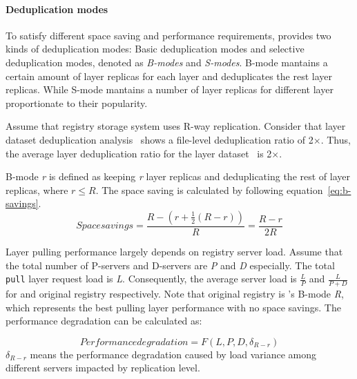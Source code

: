 \paragraph{Deduplication modes}
\label{sec:dedup-mode}

To satisfy different space saving and performance requirements,
\sysname provides two kinds of deduplication modes:
Basic deduplication modes and selective deduplication modes, denoted as \emph{B-modes} and \emph{S-modes}.
B-mode mantains a certain amount of layer replicas for each layer and deduplicates the rest layer replicas.
While S-mode mantains a number of layer replicas for different layer proportionate to their popularity.

Assume that registry storage system uses R-way replication.
Consider that layer dataset deduplication analysis~\cite{xxx} shows a file-level deduplication ratio of 2$\times$.
Thus, the average layer deduplication ratio for the layer dataset~\cite{xxx} is 2$\times$.

B-mode \emph{r} is defined as keeping \emph{r} layer replicas and deduplicating the rest of layer replicas, where $r \leq R$. 
The space saving is calculated by following equation~\ref{eq:b-savings}.
\begin{equation}\label{eq:b-savings}
Space savings = \frac{R-(r+\frac{1}{2}(R-r))}{R} = \frac{R-r}{2R}
\end{equation}

Layer pulling performance largely depends on registry server load.
Assume that the total number of P-servers and D-servers are \emph{P} and \emph{D} especially.
The total \texttt{pull} layer request load is \emph{L}.
Consequently, the average server load is $\frac{L}{P}$ and $\frac{L}{P+D}$ for \sysname and original registry respectively.
Note that original registry is \sysname's B-mode \emph{R}, which represents the best pulling layer performance with no space savings.
The performance degradation can be calculated as:
 
 \begin{equation}\label{eq:c-pull}
Performance degradation =  F(L, P, D, \delta_{R-r})
 \end{equation}
 $\delta_{R-r}$ means the performance degradation caused by load variance among different servers impacted by replication level.

